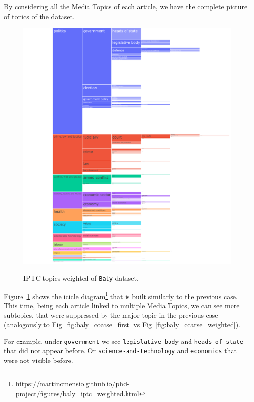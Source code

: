 By considering all the Media Topics of each article, we have the complete picture of topics of the dataset. 

\begin{figure}[!htbp]
    \centering
    \href{https://martinomensio.github.io/phd-project/figures/baly_iptc_weighted.html}{\includegraphics[trim={2.65cm 0cm 0cm 0cm},clip,width=\linewidth]{figures/baly_iptc_weighted.pdf}}
    \caption{IPTC topics weighted of \texttt{Baly} dataset.}
    \label{fig:baly_iptc_weighted}
\end{figure}

Figure~\ref{fig:baly_iptc_weighted}
shows the icicle diagram\footnote{\url{https://martinomensio.github.io/phd-project/figures/baly_iptc_weighted.html}} that is built similarly to the previous case. This time, being each article linked to multiple Media Topics, we can see more subtopics, that were suppressed by the major topic in the previous case (analogously to Fig~\ref{fig:baly_coarse_first} vs Fig~\ref{fig:baly_coarse_weighted}).

For example, under \texttt{government} we see \texttt{legislative-bod}y and \texttt{heads-of-state} that did not appear before. Or \texttt{science-and-technology} and \texttt{economics} that were not visible before.


